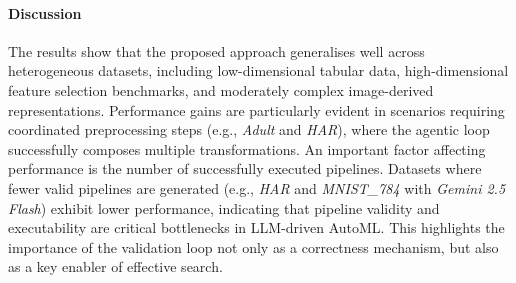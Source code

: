 \documentclass[runningheads]{llncs}
\begin{document}


\paragraph{Discussion}

The results show that the proposed approach generalises well across heterogeneous datasets,
including low-dimensional tabular data,
high-dimensional feature selection benchmarks,
and moderately complex image-derived representations.
%
Performance gains are particularly evident in scenarios requiring coordinated preprocessing steps
(e.g., \textit{Adult} and \textit{HAR}),
where the agentic loop successfully composes multiple transformations.
%
% 
An important factor affecting performance is the number of successfully executed pipelines.
%
Datasets where fewer valid pipelines are generated
(e.g., \textit{HAR} and \textit{MNIST\_784} with \textit{Gemini 2.5 Flash})
exhibit lower performance,
indicating that pipeline validity and executability are critical bottlenecks in LLM-driven \ac{AutoML}.
%
This highlights the importance of the validation loop not only as a correctness mechanism,
but also as a key enabler of effective search.

\end{document}
